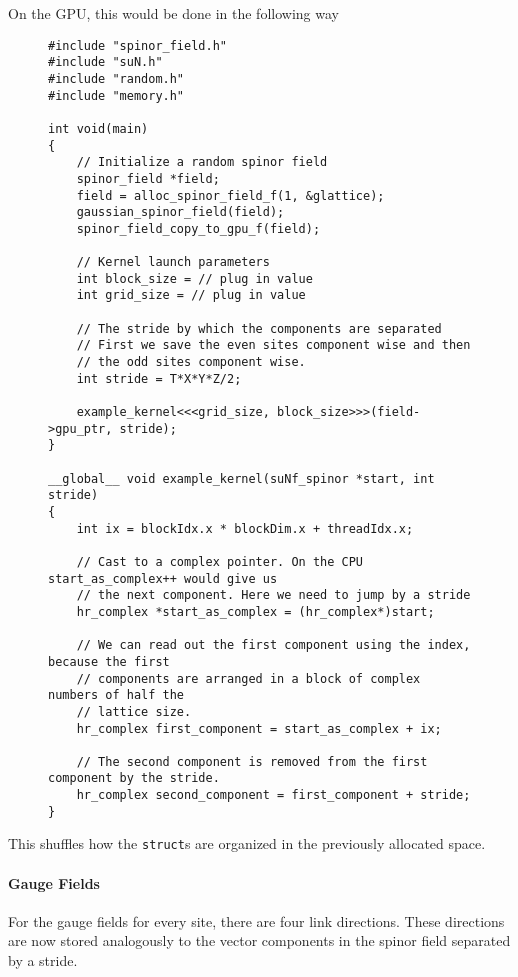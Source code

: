 \documentclass[12pt]{article}
\begin{document}
On the GPU, this would be done in the following way
\begin{figure}[H]
\begin{lstlisting}[caption=Low level access of single components on GPU]
#include "spinor_field.h"
#include "suN.h"
#include "random.h"
#include "memory.h"

int void(main) 
{
    // Initialize a random spinor field
    spinor_field *field;
    field = alloc_spinor_field_f(1, &glattice);
    gaussian_spinor_field(field);
    spinor_field_copy_to_gpu_f(field);
    
    // Kernel launch parameters
    int block_size = // plug in value
    int grid_size = // plug in value
    
    // The stride by which the components are separated
    // First we save the even sites component wise and then
    // the odd sites component wise.
    int stride = T*X*Y*Z/2;
    
    example_kernel<<<grid_size, block_size>>>(field->gpu_ptr, stride);
}

__global__ void example_kernel(suNf_spinor *start, int stride) 
{
    int ix = blockIdx.x * blockDim.x + threadIdx.x;
    
    // Cast to a complex pointer. On the CPU start_as_complex++ would give us
    // the next component. Here we need to jump by a stride
    hr_complex *start_as_complex = (hr_complex*)start;
    
    // We can read out the first component using the index, because the first 
    // components are arranged in a block of complex numbers of half the 
    // lattice size.
    hr_complex first_component = start_as_complex + ix;
    
    // The second component is removed from the first component by the stride.
    hr_complex second_component = first_component + stride;
}
\end{lstlisting}
\end{figure}
This shuffles how the \texttt{struct}s are organized in the previously allocated space.


\paragraph{Gauge Fields}
For the gauge fields for every site, there are four link directions. These directions are now stored analogously to the vector components in the spinor field separated by a stride.
\end{document}
